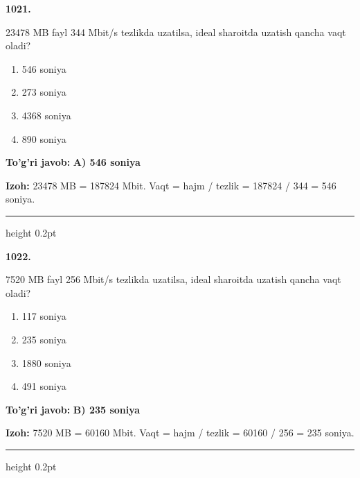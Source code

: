 \documentclass[10pt,a4paper,oneside]{article}
\begin{document}
\noindent\textbf{\color{ink}1021.}
\par
23478 MB fayl 344 Mbit/s tezlikda uzatilsa, ideal sharoitda uzatish qancha vaqt oladi?
\begin{enumerate}[label=\Alph*),leftmargin=9mm]
\item 546 soniya
\item 273 soniya
\item 4368 soniya
\item 890 soniya
\end{enumerate}
\begin{tcolorbox}[enhanced,breakable,colback=teal!4,colframe=teal!50!black,boxrule=0.5pt,arc=1.1mm,left=3mm,right=3mm,top=1.7mm,bottom=1.7mm,before skip=2mm,after skip=2mm]
\textbf{\color{teal}To'g'ri javob:} \textbf{A) 546 soniya}
\par\smallskip
\textbf{Izoh:} 23478 MB = 187824 Mbit. Vaqt = hajm / tezlik = 187824 / 344 = 546 soniya.
\end{tcolorbox}
\vspace{2mm}\hrule height 0.2pt \vspace{3mm}

\noindent\textbf{\color{ink}1022.}
\par
7520 MB fayl 256 Mbit/s tezlikda uzatilsa, ideal sharoitda uzatish qancha vaqt oladi?
\begin{enumerate}[label=\Alph*),leftmargin=9mm]
\item 117 soniya
\item 235 soniya
\item 1880 soniya
\item 491 soniya
\end{enumerate}
\begin{tcolorbox}[enhanced,breakable,colback=teal!4,colframe=teal!50!black,boxrule=0.5pt,arc=1.1mm,left=3mm,right=3mm,top=1.7mm,bottom=1.7mm,before skip=2mm,after skip=2mm]
\textbf{\color{teal}To'g'ri javob:} \textbf{B) 235 soniya}
\par\smallskip
\textbf{Izoh:} 7520 MB = 60160 Mbit. Vaqt = hajm / tezlik = 60160 / 256 = 235 soniya.
\end{tcolorbox}
\vspace{2mm}\hrule height 0.2pt \vspace{3mm}
\end{document}
